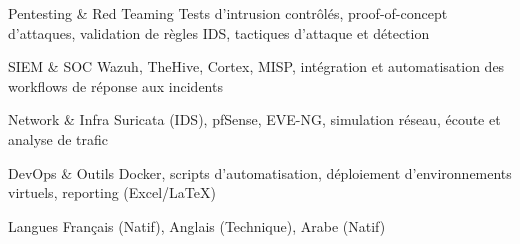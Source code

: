
\begin{cvskills}

    \cvskill
    {Pentesting \& Red Teaming} %
    {Tests d'intrusion contrôlés, proof-of-concept d'attaques, validation de règles IDS, tactiques d'attaque et détection} %

    \cvskill
    {SIEM \& SOC} %
    {Wazuh, TheHive, Cortex, MISP, intégration et automatisation des workflows de réponse aux incidents} %

    \cvskill
    {Network \& Infra} %
    {Suricata (IDS), pfSense, EVE-NG, simulation réseau, écoute et analyse de trafic} %

    \cvskill
    {DevOps \& Outils} %
    {Docker, scripts d'automatisation, déploiement d'environnements virtuels, reporting (Excel/LaTeX)} %

    \cvskill
    {Langues} %
    {Français (Natif), Anglais (Technique), Arabe (Natif)} %

\end{cvskills}